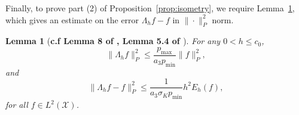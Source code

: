 \documentclass[twoside]{article}
\newcommand{\1}{\mathbf{1}}
\newcommand{\Xset}{\mathcal{X}}
\newcommand{\Leb}{L}
\newtheorem{lemma}{Lemma}
\theoremstyle{definition}
\theoremstyle{remark}
\begin{document}
Finally, to prove part (2) of Proposition~\ref{prop:isometry}, we require Lemma~\ref{lem:smoothening_error}, which gives an estimate on the error $\Lambda_h f - f$ in $\|\cdot\|_P^2$ norm.
\begin{lemma}[\textbf{c.f Lemma 8 of \citet{trillos2019}, Lemma 5.4 of \citet{burago2014}}]
	\label{lem:smoothening_error}
	For any $0 < h \leq c_0$, 
	\begin{equation}
	\label{eqn:smoothening_error_norm}
	\bigl\|\Lambda_hf\bigr\|_{P}^2 \leq \frac{p_{\max}}{a_3p_{\min}} \bigl\|f\bigr\|_{P}^2,
	\end{equation}
	and
	\begin{equation}
	\label{eqn:smoothening_error_energy}
	\bigl\|\Lambda_hf - f\bigr\|_{P}^2 \leq \frac{1}{a_3\sigma_Kp_{\min}} h^2 E_h(f),
	\end{equation}
	for all $f \in \Leb^2(\Xset)$.
\end{lemma}
\end{document}
